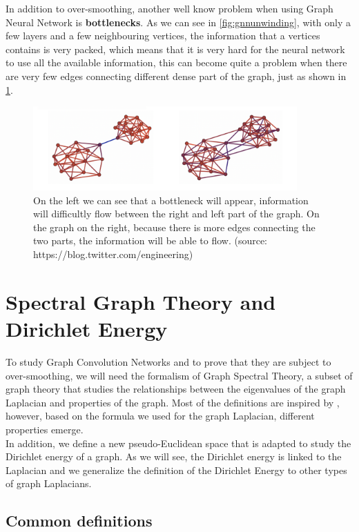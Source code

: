 \documentclass[12pt]{article}
\begin{document}
 In addition to over-smoothing, another well know problem when using Graph Neural Network is \textbf{bottlenecks}. As we can see in \ref{fig:gnnunwinding}, with only a few layers and a few neighbouring vertices, the information that a vertices contains is very packed, which means that it is very hard for the neural network to use all the available information, this can become quite a problem when there are very few edges connecting different dense part of the graph, just as shown in \ref{fig:bottlenecks}.

\begin{figure}[h!]
\centering
\includegraphics[width=0.9\textwidth]{images/bottlenecks.png}
\caption{On the left we can see that a bottleneck will appear, information will difficultly flow between the right and left part of the graph. On the graph on the right, because there is more edges connecting the two parts, the information will be able to flow. (source: https://blog.twitter.com/engineering)}
\label{fig:bottlenecks}
\end{figure}

\newpage
\section{Spectral Graph Theory and Dirichlet Energy}

To study Graph Convolution Networks and to prove that they are subject to over-smoothing, we will need the formalism of Graph Spectral Theory, a subset of graph theory that studies the relationships between the eigenvalues of the graph Laplacian and properties of the graph. Most of the definitions are inspired by , however, based on the formula we used for the graph Laplacian, different properties emerge.\\

In addition, we define a new pseudo-Euclidean space that is adapted to study the Dirichlet energy of a graph. As we will see, the Dirichlet energy is linked to the Laplacian and we generalize the definition of the Dirichlet Energy to other types of graph Laplacians.


\subsection{Common definitions}
\end{document}
